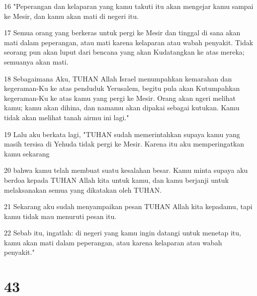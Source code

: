 \par 16 "Peperangan dan kelaparan yang kamu takuti itu akan mengejar kamu sampai ke Mesir, dan kamu akan mati di negeri itu.
\par 17 Semua orang yang berkeras untuk pergi ke Mesir dan tinggal di sana akan mati dalam peperangan, atau mati karena kelaparan atau wabah penyakit. Tidak seorang pun akan luput dari bencana yang akan Kudatangkan ke atas mereka; semuanya akan mati.
\par 18 Sebagaimana Aku, TUHAN Allah Israel menumpahkan kemarahan dan kegeraman-Ku ke atas penduduk Yerusalem, begitu pula akan Kutumpahkan kegeraman-Ku ke atas kamu yang pergi ke Mesir. Orang akan ngeri melihat kamu; kamu akan dihina, dan namamu akan dipakai sebagai kutukan. Kamu tidak akan melihat tanah airmu ini lagi."
\par 19 Lalu aku berkata lagi, "TUHAN sudah memerintahkan supaya kamu yang masih tersisa di Yehuda tidak pergi ke Mesir. Karena itu aku memperingatkan kamu sekarang
\par 20 bahwa kamu telah membuat suatu kesalahan besar. Kamu minta supaya aku berdoa kepada TUHAN Allah kita untuk kamu, dan kamu berjanji untuk melaksanakan semua yang dikatakan oleh TUHAN.
\par 21 Sekarang aku sudah menyampaikan pesan TUHAN Allah kita kepadamu, tapi kamu tidak mau menuruti pesan itu.
\par 22 Sebab itu, ingatlah: di negeri yang kamu ingin datangi untuk menetap itu, kamu akan mati dalam peperangan, atau karena kelaparan atau wabah penyakit."

\chapter{43}

